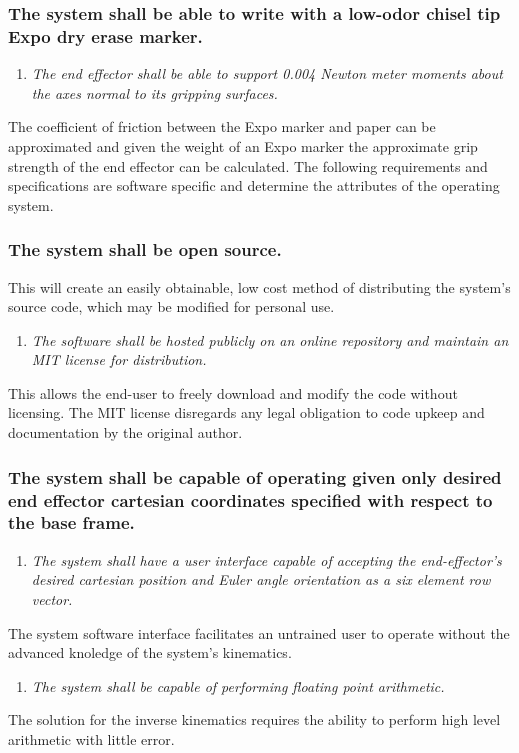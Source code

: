 \subsubsection{The system shall be able to write with a low-odor chisel tip Expo dry erase marker.}
\begin{enumerate}
  \item \textit{The end effector shall be able to support 0.004 Newton meter moments about the axes normal to its gripping surfaces.}
\end{enumerate}
  The coefficient of friction between the Expo marker and paper can be approximated and given the weight of an Expo marker the approximate grip strength of the end effector can be calculated.
The following requirements and specifications are software specific and determine the attributes of the operating system.
\subsubsection{The system shall be open source.}
This will create an easily obtainable, low cost method of distributing the system’s source code, which may be modified for personal use.
\begin{enumerate}
  \item \textit{The software shall be hosted publicly on an online repository and maintain an MIT license for distribution.}
\end{enumerate}
  This allows the end-user to freely download and modify the code without licensing. The MIT license disregards any legal obligation to code upkeep and documentation by the original author.

\subsubsection{The system shall be capable of operating given only desired end effector cartesian coordinates specified with respect to the base frame.}
\begin{enumerate}
  \item \textit{The system shall have a user interface capable of accepting the end-effector’s desired cartesian position and Euler angle orientation as a six element row vector.}
\end{enumerate}
  The system software interface facilitates an untrained user to operate without the advanced knoledge of the system's kinematics.
\begin{enumerate}[resume]
  \item \textit{The system shall be capable of performing floating point arithmetic.}
\end{enumerate}
The solution for the inverse kinematics requires the ability to perform high level arithmetic with little error.
